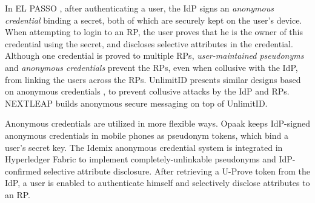 
In EL PASSO \cite{ELPASSO}, after authenticating a user,
    the IdP signs an \emph{anonymous credential} \cite{anon-credential} binding a secret,
         both of which are securely kept on the user's device.
When attempting to login to an RP,
    the user proves that he is the owner of this credential using the secret,
        and discloses selective attributes in the credential.
Although one credential is proved to multiple RPs,
        \emph{user-maintained pseudonyms} and \emph{anonymous credentials} prevent the RPs, even when collusive with the IdP, from linking the users across the RPs.
UnlimitID \cite{UnlimitID} presents similar designs based on anonymous credentials \cite{anon-credential},
        to prevent collusive attacks by the IdP and RPs.
NEXTLEAP \cite{nextleap} builds anonymous secure messaging on top of UnlimitID.


Anonymous credentials \cite{anon-credential-2001,anon-credential} are utilized in more flexible ways.
Opaak \cite{Opaak} keeps IdP-signed anonymous credentials in mobile phones as pseudonym tokens,
    which bind a user's secret key.
The Idemix anonymous credential system \cite{idemix}
 is integrated in Hyperledger Fabric \cite{hyperledge-idemix} to implement completely-unlinkable pseudonyms
        and IdP-confirmed selective attribute disclosure.
After retrieving a U-Prove token \cite{uprov,uprove-conference} from the IdP,
    a user is enabled to authenticate himself and selectively disclose attributes to an RP.

